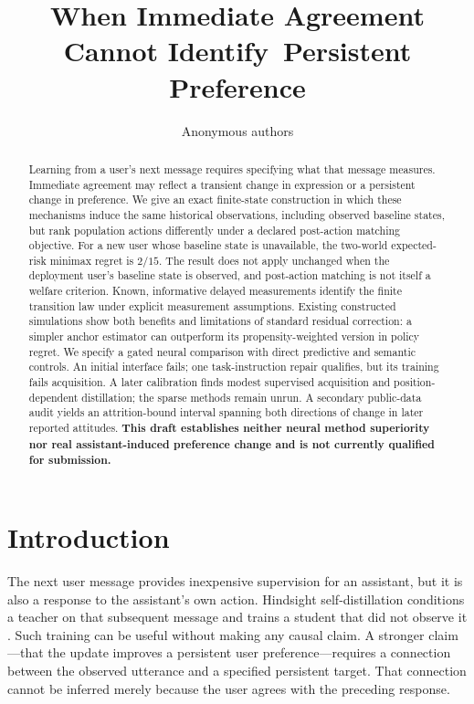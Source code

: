 \documentclass{article}
\title{When Immediate Agreement Cannot Identify\ Persistent Preference}
\author{Anonymous authors}
\begin{document}
\maketitle

\begin{abstract}
Learning from a user's next message requires specifying what that message
measures. Immediate agreement may reflect a transient change in expression or
a persistent change in preference. We give an exact finite-state construction
in which these mechanisms induce the same historical observations, including
observed baseline states, but rank population actions differently under a
declared post-action matching objective. For a new user whose baseline state is
unavailable, the two-world expected-risk minimax regret is $2/15$. The result
does not apply unchanged when the deployment user's baseline state is observed,
and post-action matching is not itself a welfare criterion. Known, informative
delayed measurements identify the finite transition law under explicit
measurement assumptions. Existing constructed simulations show both benefits
and limitations of standard residual correction: a simpler anchor estimator can
outperform its propensity-weighted version in policy regret. We specify a
gated neural comparison with direct predictive and semantic controls. An initial
interface fails; one task-instruction repair qualifies, but its training fails
acquisition. A later calibration finds modest supervised acquisition and
position-dependent distillation; the sparse methods remain unrun. A secondary public-data
audit yields an attrition-bound interval spanning both directions of change in
later reported attitudes. \textbf{This draft establishes neither neural method
superiority nor real assistant-induced preference change and is not currently
qualified for submission.}
\end{abstract}

\section{Introduction}
The next user message provides inexpensive supervision for an assistant, but
it is also a response to the assistant's own action. Hindsight self-distillation
conditions a teacher on that subsequent message and trains a student that did
not observe it \citep{sdpo}. Such training can be useful without making any
causal claim. A stronger claim---that the update improves a persistent user
preference---requires a connection between the observed utterance and a
specified persistent target. That connection cannot be inferred merely because
the user agrees with the preceding response.
\end{document}
